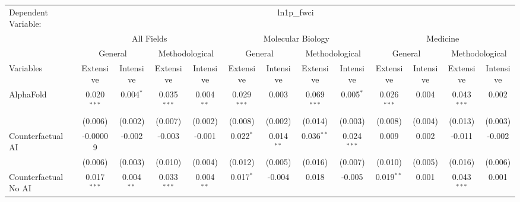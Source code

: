 \begingroup
\centering
\begin{tabular}{lcccccccccccc}
   \tabularnewline \midrule \midrule
   Dependent Variable: & \multicolumn{12}{c}{ln1p\_fwci}\\
 & \multicolumn{4}{c}{All Fields} & \multicolumn{4}{c}{Molecular Biology} & \multicolumn{4}{c}{Medicine} \\
\cmidrule(lr){2-5} \cmidrule(lr){6-9} \cmidrule(lr){10-13}
 & \multicolumn{2}{c}{General} & \multicolumn{2}{c}{Methodological} & \multicolumn{2}{c}{General} & \multicolumn{2}{c}{Methodological} & \multicolumn{2}{c}{General} & \multicolumn{2}{c}{Methodological} \\
\cmidrule(lr){2-3} \cmidrule(lr){4-5} \cmidrule(lr){6-7} \cmidrule(lr){8-9} \cmidrule(lr){10-11} \cmidrule(lr){12-13}
Variables & \multicolumn{1}{c}{Extensive} & \multicolumn{1}{c}{Intensive} & \multicolumn{1}{c}{Extensive} & \multicolumn{1}{c}{Intensive} & \multicolumn{1}{c}{Extensive} & \multicolumn{1}{c}{Intensive} & \multicolumn{1}{c}{Extensive} & \multicolumn{1}{c}{Intensive} & \multicolumn{1}{c}{Extensive} & \multicolumn{1}{c}{Intensive} & \multicolumn{1}{c}{Extensive} & \multicolumn{1}{c}{Intensive} \\
\cmidrule(lr){1-1}\cmidrule(lr){2-2} \cmidrule(lr){3-3} \cmidrule(lr){4-4} \cmidrule(lr){5-5} \cmidrule(lr){6-6} \cmidrule(lr){7-7} \cmidrule(lr){8-8} \cmidrule(lr){9-9} \cmidrule(lr){10-10} \cmidrule(lr){11-11} \cmidrule(lr){12-12} \cmidrule(lr){13-13}
   AlphaFold                                & 0.020$^{***}$ & 0.004$^{*}$   & 0.035$^{***}$ & 0.004$^{**}$  & 0.029$^{***}$ & 0.003        & 0.069$^{***}$  & 0.005$^{*}$   & 0.026$^{***}$ & 0.004    & 0.043$^{***}$ & 0.002\\   
                                            & (0.006)       & (0.002)       & (0.007)       & (0.002)       & (0.008)       & (0.002)      & (0.014)        & (0.003)       & (0.008)       & (0.004)  & (0.013)       & (0.003)\\   
   Counterfactual AI                        & -0.00009      & -0.002        & -0.003        & -0.001        & 0.022$^{*}$   & 0.014$^{**}$ & 0.036$^{**}$   & 0.024$^{***}$ & 0.009         & 0.002    & -0.011        & -0.002\\   
                                            & (0.006)       & (0.003)       & (0.010)       & (0.004)       & (0.012)       & (0.005)      & (0.016)        & (0.007)       & (0.010)       & (0.005)  & (0.016)       & (0.006)\\   
   Counterfactual No AI                     & 0.017$^{***}$ & 0.004$^{**}$  & 0.033$^{***}$ & 0.004$^{**}$  & 0.017$^{*}$   & -0.004       & 0.018          & -0.005        & 0.019$^{**}$  & 0.001    & 0.043$^{***}$ & 0.001\\   

\end{tabular}
